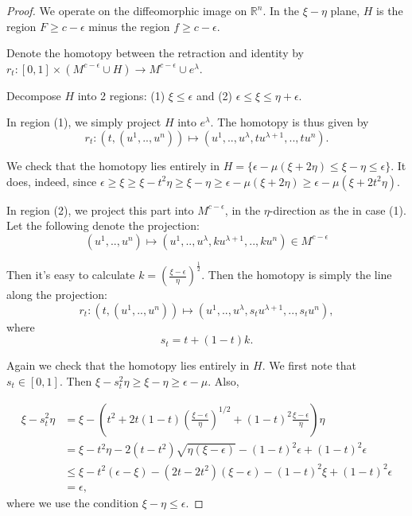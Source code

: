 \documentclass[a4paper,11pt,reqno]{amsart}
\newcommand{\RR}{\mathbb{R}}      %
\begin{document}
\begin{proof}
  We operate on the diffeomorphic image on $\RR^n$. In the $\xi-\eta$ plane, $H$
  is the region $F \ge c-\epsilon$ minus the region $f \ge c-\epsilon$.
  
  Denote the homotopy between the retraction and identity by $r_t : [0,1]\times
  (M^{c-\epsilon}\cup H) \to M^{c-\epsilon} \cup e^\lambda$.
  
  Decompose $H$ into 2 regions: (1) $\xi \le \epsilon$ and (2) $\epsilon \le \xi
  \le \eta + \epsilon$.

  In region (1), we simply project $H$ into $e^\lambda$. The homotopy is thus
  given by 
  \begin{equation}
    r_t: (t, (u^1,..,u^n)) \mapsto (u^1, .., u^\lambda, tu^{\lambda+1}, .., tu^n).
  \end{equation}

  We check that the homotopy lies entirely in $H =
  \{\epsilon-\mu(\xi+2\eta) \le \xi-\eta \le \epsilon \}$. It does,
  indeed, since $\epsilon \ge \xi \ge \xi-t^2\eta \ge \xi-\eta \ge
  \epsilon-\mu(\xi+2\eta) \ge \epsilon-\mu(\xi+2t^2\eta)$.

  In region (2), we project this part into $M^{c-\epsilon}$, in the
  $\eta$-direction as the in case (1). Let the following denote the projection:
  \begin{equation}
    (u^1, .., u^n) \mapsto
    (u^1, .., u^\lambda, ku^{\lambda+1}, .., ku^n) \in M^{c-\epsilon}
  \end{equation}
  
  Then it's easy to calculate $k =
  (\frac{\xi-\epsilon}{\eta})^{\frac{1}{2}}$. Then the homotopy is simply the
  line along the projection:
  \begin{equation}
    r_t: (t, (u^1,..,u^n)) \mapsto
    (u^1, .., u^\lambda, s_tu^{\lambda+1}, .., s_tu^n),
  \end{equation}
  where
  \begin{equation}
    s_t = t + (1-t)k.
  \end{equation}

  Again we check that the homotopy lies entirely in $H$. We first note that $s_t
  \in [0,1]$. Then $\xi-s_t^2\eta \ge \xi-\eta \ge \epsilon-\mu$. Also,

  \begin{equation}
    \begin{aligned}
      \xi-s_t^2\eta &= \xi -
      (t^2+2t(1-t)(\frac{\xi-\epsilon}{\eta})^{1/2}+(1-t)^2\frac{\xi-\epsilon}{\eta})\eta
      \\
      &=
      \xi-t^2\eta-2(t-t^2)\sqrt{\eta(\xi-\epsilon)}-(1-t)^2\epsilon+(1-t)^2\epsilon
      \\
      &\le
      \xi-t^2(\epsilon-\xi)-(2t-2t^2)(\xi-\epsilon)-(1-t)^2\xi+(1-t)^2\epsilon
      \\
      &= \epsilon,
    \end{aligned}
  \end{equation}
  where we use the condition $\xi-\eta \le \epsilon$.


\end{proof}
\end{document}
